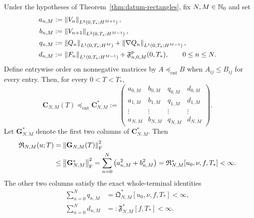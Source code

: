 \begin{proposition}
\label{prop:datum-terminal-matrix-consequence}
Under the hypotheses of Theorem~\ref{thm:datum-rectangles}, fix
\(N,M\in\mathbb N_0\) and set
\begin{align}
 a_{n,M}
 &:=\left\lVert V_n\right\rVert_{L^2(0,T_*;H^{M+1})},\notag\\
 b_{n,M}
 &:=\left\lVert V_{n+1}\right\rVert_{L^2(0,T_*;H^{M-1})},\notag\\
 q_{n,M}
 &:=\left\lVert Q_n\right\rVert_{L^1(0,T_*;H^M)}
   +\left\lVert \nabla Q_n\right\rVert_{L^1(0,T_*;H^{M-1})},\notag\\
 d_{n,M}
 &:=\left\lVert F_n\right\rVert_{L^1(0,T_*;H^{M-1})}
   +\mathfrak F^{\rm p}_{n,0,M}(0,T_*),
 \qquad 0\le n\le N.
 \label{eq:datum-terminal-coordinate-norms}
\end{align}
Define entrywise order on nonnegative matrices by
\(A\preceq_{\mathrm{ent}}B\) when \(A_{ij}\le B_{ij}\) for every entry.
Then, for every \(0<T<T_*\),
\begin{equation}
 \mathbf C_{N,M}(T)
 \preceq_{\mathrm{ent}}
 \mathbf C_{N,M}^*
 :=
 \begin{pmatrix}
  a_{0,M}&b_{0,M}&q_{0,M}&d_{0,M}\\
  a_{1,M}&b_{1,M}&q_{1,M}&d_{1,M}\\
  \vdots&\vdots&\vdots&\vdots\\
  a_{N,M}&b_{N,M}&q_{N,M}&d_{N,M}
 \end{pmatrix}.
 \label{eq:datum-terminal-matrix-bound}
\end{equation}
Let \(\mathbf G_{N,M}^*\) denote the first two columns of
\(\mathbf C_{N,M}^*\).  Then
\begin{align}
 \mathfrak R_{N,M}(u;T)
 &=\left\lVert \mathbf G_{N,M}(T)\right\rVert_{\mathrm F}^2\notag\\
 &\le\left\lVert \mathbf G_{N,M}^*\right\rVert_{\mathrm F}^2
 =\sum_{n=0}^{N}\left(a_{n,M}^2+b_{n,M}^2\right)
 =\mathfrak R_{N,M}^*[u_0,\nu,f,T_*]<\infty.
 \label{eq:datum-terminal-finite-sum}
\end{align}
The other two columns satisfy the exact whole-terminal identities
\begin{align}
 \sum_{n=0}^Nq_{n,M}
 &=\mathfrak Q_{N,M}^*[u_0,\nu,f,T_*]<\infty,
 \label{eq:datum-terminal-pressure-column}\\
 \sum_{n=0}^Nd_{n,M}
 &=:\mathfrak F_{N,M}^*[f,T_*]<\infty.
 \label{eq:datum-terminal-force-column}
\end{align}
\end{proposition}

